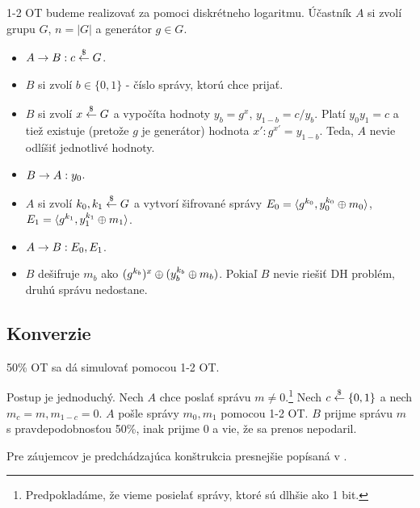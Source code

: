 \begin{priklad}[Realizácia 1-2 OT]
 1-2 OT budeme realizovať za pomoci diskrétneho logaritmu.
 Účastník $A$ si zvolí grupu $G$, $n=|G|$ a generátor $g\in G$.
 \begin{itemize}
    \compactlist
    \item $A \rightarrow B: c \overset{\$}{\leftarrow} G$.
    \item $B$ si zvolí $b\in\{0,1\}$ - číslo správy, ktorú chce
    prijať.
    \item $B$ si zvolí $x \overset{\$}{\leftarrow} G$ a vypočíta hodnoty $y_b = g^x$,
    $y_{1-b} = c/ y_b$. Platí $y_0 y_1 = c$ a tiež existuje (pretože
    $g$ je generátor) hodnota $x': g^{x'} = y_{1-b}$. Teda, $A$ nevie
    odlíšiť jednotlivé hodnoty.
    \item $B \rightarrow A: y_0$.
    \item $A$ si zvolí $k_0,k_1 \overset{\$}{\leftarrow} G$ a vytvorí šifrované správy 
    $E_0 = \langle g^{k_0}, y_0^{k_0} \oplus m_0 \rangle$,
    $E_1 = \langle g^{k_1}, y_1^{k_1} \oplus m_1 \rangle$.
    \item $A \rightarrow B: E_0, E_1$.
    \item $B$ dešifruje $m_b$ ako $(g^{k_b})^x \oplus (y_b ^ {k_b} \oplus
    m_b)$.
    Pokiaľ $B$ nevie riešiť DH problém, druhú správu nedostane.
 \end{itemize}
\end{priklad}

\subsection{Konverzie}

\begin{lema}
    50\% OT sa dá simulovať pomocou 1-2 OT.
\end{lema}
\begin{dokaz}
    Postup je jednoduchý. Nech $A$ chce poslať správu 
    $m \ne 0$.\footnote{Predpokladáme, že vieme posielať správy, ktoré
        sú dlhšie ako 1 bit.
    }
    Nech $c \overset{\$}{\leftarrow} \{0,1\}$ a nech $m_c = m, m_{1-c} = 0$. $A$ pošle
    správy $m_0, m_1$ pomocou 1-2 OT. $B$ prijme správu $m$ s
    pravdepodobnosťou 50\%, inak prijme 0 a vie, že sa prenos
    nepodaril.
\end{dokaz}

Pre záujemcov je predchádzajúca konštrukcia presnejšie popísaná v
\cite{ot_equiv}.
